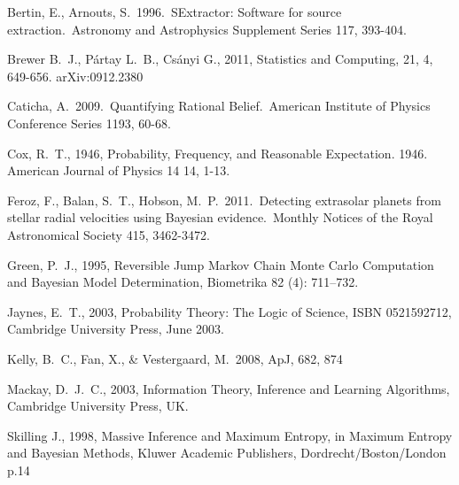 \documentclass[letterpaper, 11pt]{article}
\begin{document}





\begin{thebibliography}{99}
 Bertin, E., Arnouts, S.\ 1996.\ SExtractor: Software for source extraction.\ Astronomy and Astrophysics Supplement Series 117, 393-404.

 Brewer B.~J., P{\'a}rtay L.~B.,
Cs{\'a}nyi G., 2011, Statistics and Computing, 21, 4, 649-656. arXiv:0912.2380

 Caticha, A.\ 2009.\ 
Quantifying Rational Belief.\ American Institute of Physics Conference 
Series 1193, 60-68. 

 Cox, R.~T., 1946, Probability, Frequency, and Reasonable Expectation. 1946. American Journal of Physics 14 14, 1-13.

 Feroz, F., Balan, S.~T., 
Hobson, M.~P.\ 2011.\ Detecting extrasolar planets from stellar radial 
velocities using Bayesian evidence.\ Monthly Notices of the Royal 
Astronomical Society 415, 3462-3472. 

Green, P.~J., 1995, Reversible Jump Markov Chain Monte Carlo Computation and Bayesian Model Determination, Biometrika 82 (4): 711–732.

 Jaynes, E.~T., 2003, Probability Theory: The
Logic of Science, ISBN 0521592712, Cambridge University Press, June 2003.

 Kelly, B.~C., Fan, X., 
\& Vestergaard, M.\ 2008, ApJ, 682, 874 

 Mackay, D.~J.~C., 2003, Information Theory,
Inference and Learning Algorithms, Cambridge University Press, UK.

Skilling J., 1998, Massive Inference and Maximum Entropy, in Maximum Entropy 
and Bayesian Methods, Kluwer Academic Publishers, Dordrecht/Boston/London p.14
\end{thebibliography}
\end{document}

